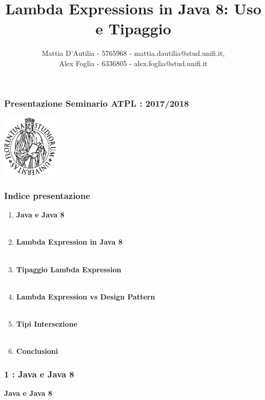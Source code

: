 \documentclass{beamer}
\title[Seminario ATPL 17/18]{Lambda Expressions in Java 8: Uso e Tipaggio}
\author[]{Mattia D'Autilia - 5765968 - mattia.dautilia@stud.unifi.it,\\ Alex Foglia - 6336805 - alex.foglia@stud.unifi.it}
\date{}
\begin{document}

\begin{frame}
	\frametitle{\textbf{Presentazione Seminario ATPL : 2017/2018}}
	\begin{center}
  		\includegraphics[width=0.2\textwidth]{assets/logo-unifi.png}
  	\end{center}
	\titlepage 
\end{frame}


\begin{frame}
	\frametitle{\textbf{Indice presentazione}}
	\begin{large}
	\begin{enumerate}
		\item
			\textbf{Java e Java 8}\\\
		\item
			\textbf{Lambda Expression in Java 8}\\\
		\item
			\textbf{Tipaggio Lambda Expression}\\\
		\item
			\textbf{Lambda Expression vs Design Pattern}\\\
		\item			
			\textbf{Tipi Intersezione}\\\
		\item
			\textbf{Conclusioni}
	\end{enumerate}
	\end{large}
\end{frame}


\begin{frame}
	\frametitle{\textbf{1 : Java e Java 8}}
	\begin{center}
		\textbf{\Huge Java e Java 8}
	\end{center}
\end{frame}

\end{document}
